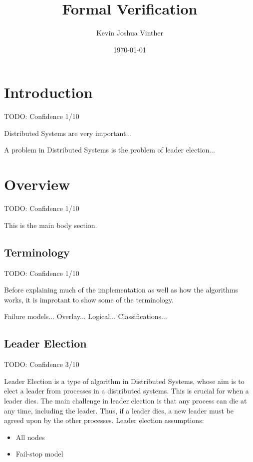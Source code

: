 \documentclass{article}
\title{Formal Verification}
\author{Kevin Joshua Vinther}
\date{\today}
\begin{document}
\maketitle



\section{Introduction}
TODO: Confidence 1/10

Distributed Systems are very important...

A problem in Distributed Systems is the problem of leader election...

\section{Overview}
TODO: Confidence 1/10

This is the main body section.

\subsection{Terminology}
TODO: Confidence 1/10

Before explaining much of the implementation as well as how the algorithms works, it is improtant to show some of the terminology.

Failure models...
Overlay...
Logical...
Classifications...

\subsection{Leader Election}
TODO: Confidence 3/10

Leader Election is a type of algorithm in Distributed Systems, whose aim is to elect a leader from processes in a distributed systems. This is crucial for when a leader dies. The main challenge in leader election is that any process can die at any time, including the leader. Thus, if a leader dies, a new leader must be agreed upon by the other processes.
Leader election assumptions:
\begin{itemize}
        \item All nodes
        \item Fail-stop model
\end{itemize}
\end{document}
